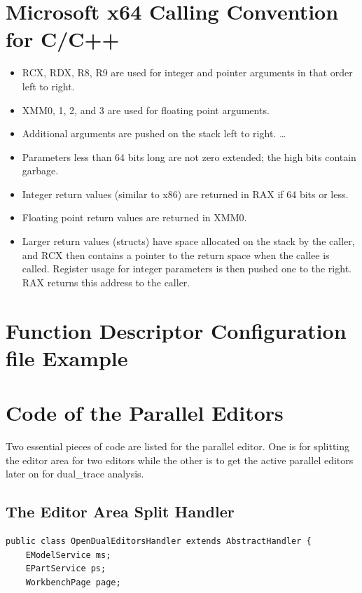 \documentclass[12pt,oneside]{book}
\begin{document}
	\begin{appendices}	
\chapter{Microsoft x64 Calling Convention for C/C++}\label{convention}
\begin{itemize}  
\item RCX, RDX, R8, R9 are used for integer and pointer arguments in that order left to right.
\item XMM0, 1, 2, and 3 are used for floating point arguments.
\item Additional arguments are pushed on the stack left to right. \ldots 
\item Parameters less than 64 bits long are not zero extended; the high bits contain garbage.
\item Integer return values (similar to x86) are returned in RAX if 64 bits or less.
\item Floating point return values are returned in XMM0.
\item Larger return values (structs) have space allocated on the stack by the caller, and RCX then contains a pointer to the return space when the callee is called. Register usage for integer parameters is then pushed one to the right. RAX returns this address to the caller.
\end{itemize}

\chapter{Function Descriptor Configuration file Example}\label{funcset}


\chapter{Code of the Parallel Editors}\label{paralleleditor}
Two essential pieces of code are listed for the parallel editor. One is for splitting the editor area for two editors while the other is to get the active parallel editors later on  for dual\_trace analysis.
\section{The Editor Area Split Handler}
\begin{lstlisting}[caption= code in OpenDualEditorsHandler.java]
public class OpenDualEditorsHandler extends AbstractHandler {
	EModelService ms;
	EPartService ps;
	WorkbenchPage page;


\end{lstlisting}
\end{appendices}
\end{document}
